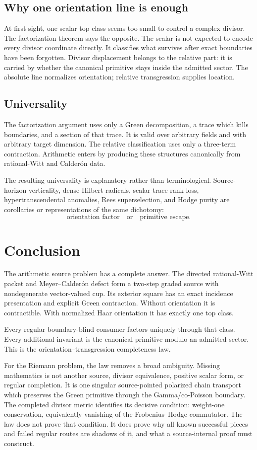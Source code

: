 \documentclass[11pt]{article}
\theoremstyle{definition}
\theoremstyle{remark}
\begin{document}
\subsection{Why one orientation line is enough}

At first sight, one scalar top class seems too small to control a complex
divisor.  The factorization theorem says the opposite.  The scalar is not
expected to encode every divisor coordinate directly.  It classifies what
survives after exact boundaries have been forgotten.  Divisor displacement
belongs to the relative part: it is carried by whether the canonical
primitive stays inside the admitted sector.  The absolute line normalizes
orientation; relative transgression supplies location.

\subsection{Universality}

The factorization argument uses only a Green decomposition, a trace which
kills boundaries, and a section of that trace.  It is valid over arbitrary
fields and with arbitrary target dimension.  The relative classification
uses only a three-term contraction.  Arithmetic enters by producing these
structures canonically from rational-Witt and Calder\'on data.

The resulting universality is explanatory rather than terminological.
Source-horizon verticality, dense Hilbert radicals, scalar-trace rank loss,
hypertranscendental anomalies, Rees superselection, and Hodge purity are
corollaries or representations of the same dichotomy:
\[
                \text{orientation factor}\quad\text{or}\quad
                \text{primitive escape}.
\tag{9.1}\label{eq:dichotomy}
\]

\section{Conclusion}

The arithmetic source problem has a complete answer.  The directed
rational-Witt packet and Meyer--Calder\'on defect form a two-step graded
source with nondegenerate vector-valued cup.  Its exterior square has an
exact incidence presentation and explicit Green contraction.  Without
orientation it is contractible.  With normalized Haar orientation it has
exactly one top class.

Every regular boundary-blind consumer factors uniquely through that class.
Every additional invariant is the canonical primitive modulo an admitted
sector.  This is the orientation--transgression completeness law.

For the Riemann problem, the law removes a broad ambiguity.  Missing
mathematics is not another source, divisor equivalence, positive scalar
form, or regular completion.  It is one singular source-pointed polarized
chain transport which preserves the Green primitive through the
Gamma/co-Poisson boundary.  The completed divisor metric identifies its
decisive condition: weight-one conservation, equivalently vanishing of the
Frobenius--Hodge commutator.  The law does not prove that condition.  It
does prove why all known successful pieces and failed regular routes are
shadows of it, and what a source-internal proof must construct.
\end{document}
